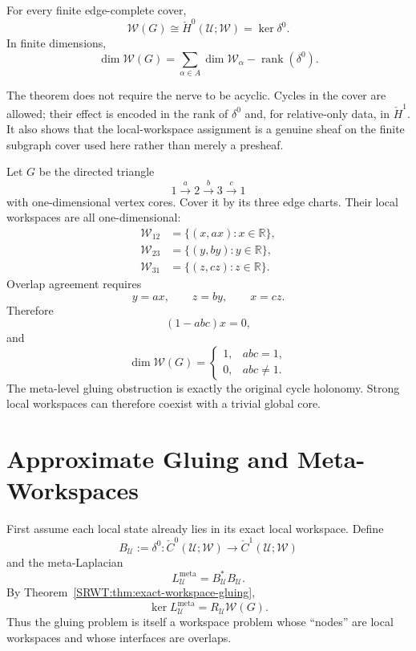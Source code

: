 \begin{SRWTcorollary}\label{SRWT:cor:zeroth-descent}
For every finite edge-complete cover,
\[
\boxed{
\mathscr W(G)
\cong
\check H^0(\mathcal U;\mathscr W)
=
\ker\delta^0.
}
\]
In finite dimensions,
\[
\boxed{
\dim\mathscr W(G)
=
\sum_{\alpha\in A}\dim\mathscr W_\alpha
-
\operatorname{rank}(\delta^0).
}
\]
\end{SRWTcorollary}

The theorem does not require the nerve to be acyclic. Cycles in the cover are
allowed; their effect is encoded in the rank of \(\delta^0\) and, for
relative-only data, in \(\check H^1\). It also shows that the local-workspace
assignment is a genuine sheaf on the finite subgraph cover used here rather
than merely a presheaf.


Let \(G\) be the directed triangle
\[
1\xrightarrow{\ a\ }2
\xrightarrow{\ b\ }3
\xrightarrow{\ c\ }1
\]
with one-dimensional vertex cores. Cover it by its three edge charts. Their
local workspaces are all one-dimensional:
\[
\begin{aligned}
\mathscr W_{12}&=\{(x,ax):x\in\mathbb R\},\\
\mathscr W_{23}&=\{(y,by):y\in\mathbb R\},\\
\mathscr W_{31}&=\{(z,cz):z\in\mathbb R\}.
\end{aligned}
\]
Overlap agreement requires
\[
y=ax,
\qquad
z=by,
\qquad
x=cz.
\]
Therefore
\[
(1-abc)x=0,
\]
and
\[
\boxed{
\dim\mathscr W(G)
=
\begin{cases}
1,&abc=1,\\
0,&abc\neq1.
\end{cases}
}
\]
The meta-level gluing obstruction is exactly the original cycle holonomy.
Strong local workspaces can therefore coexist with a trivial global core.

\section{Approximate Gluing and Meta-Workspaces}


First assume each local state already lies in its exact local workspace. Define
\[
B_{\mathcal U}
:=
\delta^0:
\check C^0(\mathcal U;\mathscr W)
\longrightarrow
\check C^1(\mathcal U;\mathscr W)
\]
and the meta-Laplacian
\[
\boxed{
L_{\mathcal U}^{\mathrm{meta}}
=
B_{\mathcal U}^*B_{\mathcal U}.
}
\]
By Theorem~\ref{SRWT:thm:exact-workspace-gluing},
\[
\boxed{
\ker L_{\mathcal U}^{\mathrm{meta}}
=
R_{\mathcal U}\mathscr W(G).
}
\]
Thus the gluing problem is itself a workspace problem whose ``nodes'' are
local workspaces and whose interfaces are overlaps.

